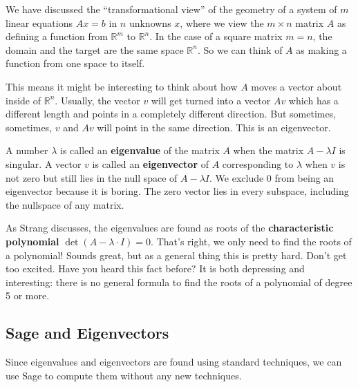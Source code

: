 \documentclass[10pt,]{book}
\newcommand{\terminology}[1]{\textbf{#1}}
\theoremstyle{plain}
\theoremstyle{definition}
\numberwithin{equation}{section}
\begin{document}
      We have discussed the ``transformational view'' of the geometry of a
      system of \(m\) linear equations \(Ax = b\) in \(n\) unknowns
      \(x\), where we view the \(m \times n\) matrix \(A\) as defining
      a function from \(\mathbb{R}^m\) to \(\mathbb{R}^n\). In the case of
      a square matrix \(m=n\), the domain and the target are the same space
      \(\mathbb{R}^n\). So we can think of \(A\) as making a function from
      one space to itself.
\par

      This means it might be interesting to think about how \(A\) moves a
      vector about inside of \(\mathbb{R}^n\). Usually, the vector \(v\)
      will get turned into a vector \(Av\) which has a different length and
      points in a completely different direction. But sometimes, sometimes,
      \(v\) and \(Av\) will point in the same direction. This is an eigenvector.
\par

      A number \(\lambda\) is called an \terminology{eigenvalue} of the matrix
      \(A\) when the matrix \(A-\lambda I\) is singular. A vector \(v\)
      is called an \terminology{eigenvector} of \(A\) corresponding to \(\lambda\)
      when \(v\) is not zero but still lies in the null space of \(A-\lambda I\).
      We exclude \(0\) from being an eigenvector because it is boring. The
      zero vector lies in every subspace, including the nullspace of any matrix.
\par

      As Strang discusses, the eigenvalues are found as roots of the
      \terminology{characteristic polynomial} \(\det(A-\lambda \cdot I) = 0\).
      That's right, we only need to find the roots of a polynomial! Sounds great,
      but as a general thing this is pretty hard. Don't get too excited. Have you
      heard this fact before? It is both depressing and interesting: there is no
      general formula to find the roots of a polynomial of degree 5 or more.
\typeout{************************************************}
\typeout{************************************************}
\subsection[Sage and Eigenvectors]{Sage and Eigenvectors}\label{subsection-128}

      Since eigenvalues and eigenvectors are found using standard techniques, we
      can use Sage to compute them without any new techniques.
\typeout{************************************************}
\typeout{************************************************}
\end{document}

